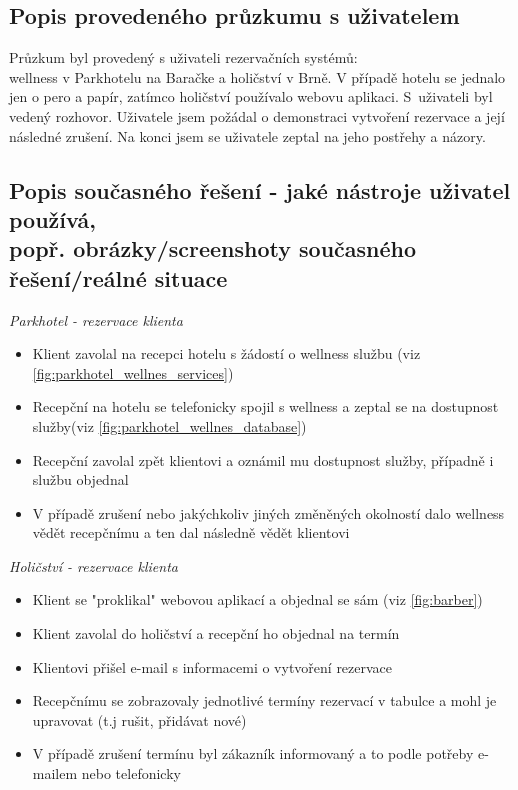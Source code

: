 \subsection{Popis provedeného průzkumu s uživatelem}
Průzkum byl provedený s uživateli rezervačních systémů: \\
wellness v Parkhotelu na Baračke a holičství v Brně.
V případě hotelu se jednalo jen o pero a papír, zatímco holičství používalo webovu aplikaci. S~uživateli byl vedený rozhovor.
Uživatele jsem požádal o demonstraci vytvoření rezervace a její následné zrušení. Na konci jsem se uživatele zeptal na jeho postřehy a názory.\\

\subsection{Popis současného řešení - jaké nástroje uživatel používá, \\
popř. obrázky/screenshoty současného řešení/reálné situace}

\noindent\emph{Parkhotel - rezervace klienta}
\begin{itemize}
    \item Klient zavolal na recepci hotelu s žádostí o wellness službu (viz \ref{fig:parkhotel_wellnes_services})
    \item Recepční na hotelu se telefonicky spojil s wellness a zeptal se na dostupnost služby(viz \ref{fig:parkhotel_wellnes_database})
    \item Recepční zavolal zpět klientovi a oznámil mu dostupnost služby, případně i službu objednal
    \item V případě zrušení nebo jakýchkoliv jiných změněných okolností dalo wellness vědět recepčnímu a ten dal následně vědět klientovi
\end{itemize}

\noindent\emph{Holičství - rezervace klienta}
\begin{itemize}
    \item Klient se "proklikal" webovou aplikací a objednal se sám (viz \ref{fig:barber})
    \item Klient zavolal do holičství a recepční ho objednal na termín
    \item Klientovi přišel e-mail s informacemi o vytvoření rezervace
    \item Recepčnímu se zobrazovaly jednotlivé termíny rezervací v tabulce a mohl je upravovat (t.j rušit, přidávat nové)
    \item V případě zrušení termínu byl zákazník informovaný a to podle potřeby e-mailem nebo telefonicky
\end{itemize}
\newpage


